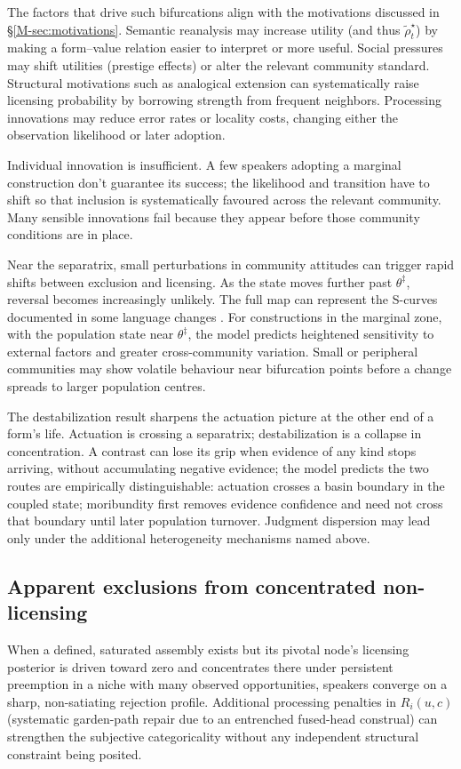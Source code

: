 The factors that drive such bifurcations align with the motivations discussed
in \S\ref{M-sec:motivations}. Semantic reanalysis may increase utility (and thus
$\widetilde{\rho}_t^\star$) by making a form--value relation easier to interpret or more useful.
Social pressures may shift utilities (prestige effects) or alter the relevant
community standard. Structural motivations such as analogical extension can
systematically raise licensing probability by borrowing strength from frequent
neighbors. Processing innovations may reduce error rates or locality
costs, changing either the observation likelihood or later adoption.

Individual innovation is insufficient. A few speakers adopting a marginal
construction don't guarantee its success; the likelihood and transition have to
shift so that inclusion is systematically favoured across the relevant
community. Many sensible innovations fail because they appear before those
community conditions are in place.

Near the separatrix, small perturbations in community attitudes can trigger
rapid shifts between exclusion and licensing. As the state moves further past
$\theta^\ddagger$, reversal becomes increasingly unlikely. The full map can
represent the S-curves documented in some language changes
\autocite{kroch1989}. For constructions in the marginal zone, with the
population state near $\theta^\ddagger$, the model predicts
heightened sensitivity to external factors and greater cross-community
variation. Small or peripheral communities may show volatile behaviour near
bifurcation points before a change spreads to larger population centres.

The destabilization result sharpens the actuation picture at the other end of a
form's life. Actuation is crossing a separatrix; destabilization is a collapse
in concentration. A contrast can lose its grip when evidence of any kind stops
arriving, without accumulating negative evidence; the model predicts the two
routes are empirically
distinguishable: actuation crosses a basin boundary in the coupled state;
moribundity first removes evidence confidence and need not cross that boundary
until later population turnover. Judgment dispersion may lead only under the
additional heterogeneity mechanisms named above.

\subsection{Apparent exclusions from concentrated non-licensing}
\label{sec:categorical-without-bans}

When a defined, saturated assembly exists but its pivotal node's licensing
posterior is driven toward zero and concentrates there under persistent
preemption in a niche with many observed opportunities, speakers converge on a sharp,
non-satiating rejection profile. Additional processing penalties in $R_i(u,c)$
(\eg systematic garden-path repair due to an entrenched fused-head construal)
can strengthen the subjective categoricality without any independent structural
constraint being posited.
